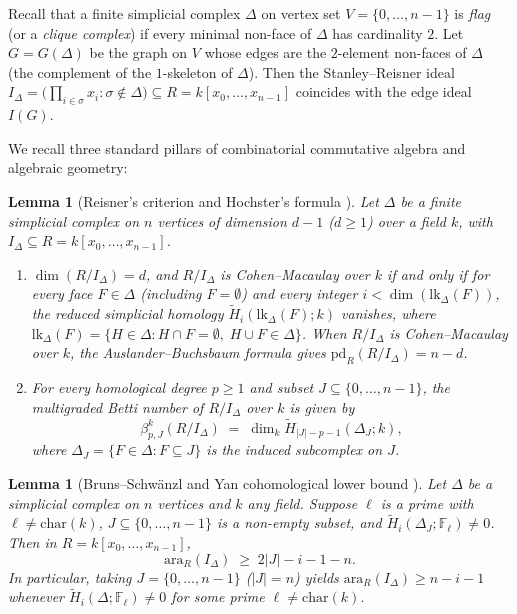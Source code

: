 \documentclass[11pt,a4paper]{amsart}
\theoremstyle{plain}
\newtheorem{lemma}[theorem]{Lemma}
\theoremstyle{definition}
\newcommand{\ara}{\mathrm{ara}}
\newcommand{\pd}{\mathrm{pd}}
\newcommand{\lk}{\mathrm{lk}}
\newcommand{\FF}{\mathbb{F}}
\begin{document}
Recall that a finite simplicial complex $\Delta$ on vertex set $V = \{0,\dots,n-1\}$ is \emph{flag} (or a \emph{clique complex}) if every minimal non-face of $\Delta$ has cardinality $2$. Let $G = G(\Delta)$ be the graph on $V$ whose edges are the $2$-element non-faces of $\Delta$ (the complement of the $1$-skeleton of $\Delta$). Then the Stanley--Reisner ideal $I_\Delta = \bigl(\prod_{i \in \sigma} x_i : \sigma \notin \Delta\bigr) \subseteq R = k[x_0,\dots,x_{n-1}]$ coincides with the edge ideal $I(G)$.

We recall three standard pillars of combinatorial commutative algebra and algebraic geometry:

\begin{lemma}[Reisner's criterion and Hochster's formula {\cite{Reisner1976,HerzogHibi2011}}]\label{lem:reisner-hochster}
Let $\Delta$ be a finite simplicial complex on $n$ vertices of dimension $d - 1$ ($d \ge 1$) over a field $k$, with $I_\Delta \subseteq R = k[x_0,\dots,x_{n-1}]$.
\begin{enumerate}
  \item[(a)] $\dim(R/I_\Delta) = d$, and $R/I_\Delta$ is Cohen--Macaulay over $k$ if and only if for every face $F \in \Delta$ (including $F = \emptyset$) and every integer $i < \dim(\lk_\Delta(F))$, the reduced simplicial homology $\widetilde{H}_i(\lk_\Delta(F); k)$ vanishes, where $\lk_\Delta(F) = \{H \in \Delta : H \cap F = \emptyset,\; H \cup F \in \Delta\}$. When $R/I_\Delta$ is Cohen--Macaulay over $k$, the Auslander--Buchsbaum formula gives $\pd_R(R/I_\Delta) = n - d$.
  \item[(b)] For every homological degree $p \ge 1$ and subset $J \subseteq \{0,\dots,n-1\}$, the multigraded Betti number of $R/I_\Delta$ over $k$ is given by
  \[
    \beta_{p,J}^k(R/I_\Delta) \;=\; \dim_k \widetilde{H}_{|J| - p - 1}(\Delta_J; k),
  \]
  where $\Delta_J = \{F \in \Delta : F \subseteq J\}$ is the induced subcomplex on $J$.
\end{enumerate}
\end{lemma}

\begin{lemma}[Bruns--Schw\"anzl and Yan cohomological lower bound {\cite{BrunsSchwanzl1990,Yan2000}}]\label{lem:yan-bound}
Let $\Delta$ be a simplicial complex on $n$ vertices and $k$ any field. Suppose $\ell$ is a prime with $\ell \neq \mathrm{char}(k)$, $J \subseteq \{0,\dots,n-1\}$ is a non-empty subset, and $\widetilde{H}_i(\Delta_J; \FF_\ell) \neq 0$. Then in $R = k[x_0,\dots,x_{n-1}]$,
\begin{equation}\label{eq:yan-bound}
  \ara_R(I_\Delta) \;\ge\; 2|J| - i - 1 - n.
\end{equation}
In particular, taking $J = \{0,\dots,n-1\}$ ($|J| = n$) yields $\ara_R(I_\Delta) \ge n - i - 1$ whenever $\widetilde{H}_i(\Delta; \FF_\ell) \neq 0$ for some prime $\ell \neq \mathrm{char}(k)$.
\end{lemma}
\end{document}
